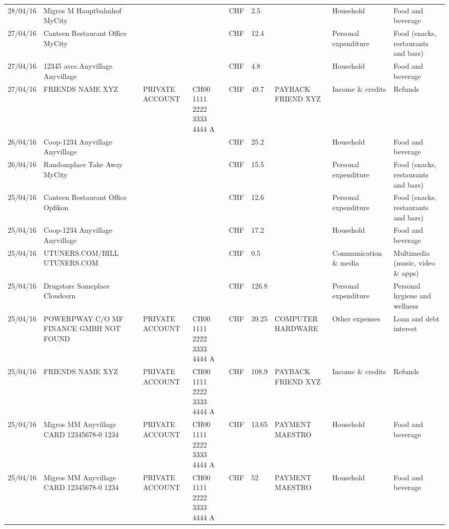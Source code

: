 \begin{landscape}
\begin{adjustwidth}{-2cm}{-2cm}
\begin{tiny}
\begin{longtable}{lp{4cm}llllp{3cm}ll}
		28/04/16 & Migros M Hauptbahnhof    MyCity &       &       & CHF   & 2.5   &       & Household & Food and beverage \\
		27/04/16 & Canteen Restaurant Office      MyCity &       &       & CHF   & 12.4  &       & Personal expenditure & Food (snacks, restaurants and bars) \\
		27/04/16 & 12345 avec.Anyvillage   Anyvillage &       &       & CHF   & 4.8   &       & Household & Food and beverage \\
		27/04/16 & FRIENDS NAME XYZ & PRIVATE ACCOUNT & CH00 1111 2222 3333 4444 A & CHF   & 49.7  & PAYBACK FRIEND XYZ & Income \& credits & Refunds \\
		26/04/16 & Coop-1234 Anyvillage    Anyvillage &       &       & CHF   & 25.2  &       & Household & Food and beverage \\
		26/04/16 & Randomplace Take Away     MyCity &       &       & CHF   & 15.5  &       & Personal expenditure & Food (snacks, restaurants and bars) \\
		25/04/16 & Canteen Restaurant Office      Opfikon &       &       & CHF   & 12.6  &       & Personal expenditure & Food (snacks, restaurants and bars) \\
		25/04/16 & Coop-1234 Anyvillage    Anyvillage &       &       & CHF   & 17.2  &       & Household & Food and beverage \\
		25/04/16 & UTUNERS.COM/BILL          UTUNERS.COM &       &       & CHF   & 0.5   &       & Communication \& media & Multimedia (music, video \& apps) \\
		25/04/16 & Drugstore Someplace      Cloudcern &       &       & CHF   & 126.8 &       & Personal expenditure & Personal hygiene and wellness \\
		25/04/16 & POWERPWAY C/O MF FINANCE GMBH NOT FOUND & PRIVATE ACCOUNT & CH00 1111 2222 3333 4444 A & CHF   & 39.25 & COMPUTER HARDWARE & Other expenses & Loan and debt interest \\
		25/04/16 & FRIENDS NAME XYZ & PRIVATE ACCOUNT & CH00 1111 2222 3333 4444 A & CHF   & 108.9 & PAYBACK FRIEND XYZ & Income \& credits & Refunds \\
		25/04/16 & Migros MM Anyvillage CARD 12345678-0 1234 & PRIVATE ACCOUNT & CH00 1111 2222 3333 4444 A & CHF   & 13.65 & PAYMENT MAESTRO & Household & Food and beverage \\
		25/04/16 & Migros MM Anyvillage CARD 12345678-0 1234 & PRIVATE ACCOUNT & CH00 1111 2222 3333 4444 A & CHF   & 52    & PAYMENT MAESTRO & Household & Food and beverage \\

\end{longtable}
\end{tiny}
\end{adjustwidth}
\end{landscape}
